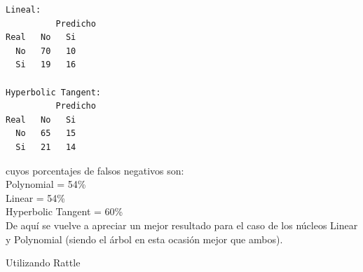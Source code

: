 \documentclass[11pt,a4paper]{report}
\begin{document}
\begin{itemize}
\begin{verbatim}
Lineal:
	      Predicho
Real   No 	Si
  No   70 	10
  Si   19 	16

Hyperbolic Tangent:
	      Predicho
Real   No 	Si
  No   65 	15 
  Si   21 	14
\end{verbatim}
cuyos porcentajes de falsos negativos son:\\
Polynomial = 54\%\\
Linear = 54\%\\
Hyperbolic Tangent = 60\%\\

De aquí se vuelve a apreciar un mejor resultado para el caso de los núcleos Linear y Polynomial (siendo el árbol en esta ocasión mejor que ambos).\\

\end{itemize}
\begin{center}
Utilizando Rattle
\end{center}
\end{document}
